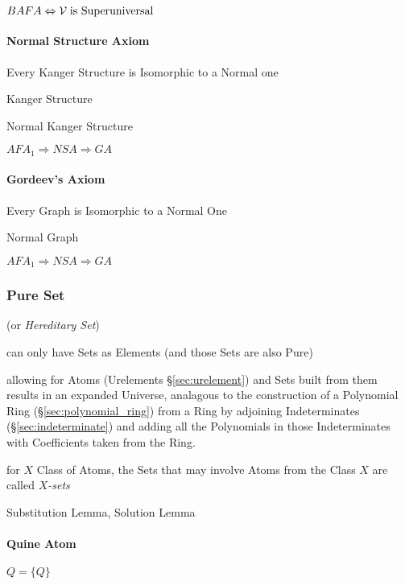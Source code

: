 $BAFA \Leftrightarrow \mathcal{V} \;\text{is Superuniversal}$



\paragraph{Normal Structure Axiom}
\label{sec:normal_structure_axiom}\hfill

Every Kanger Structure is Isomorphic to a Normal one

Kanger Structure

Normal Kanger Structure

$AFA_1 \Rightarrow NSA \Rightarrow GA$


\paragraph{Gordeev's Axiom}\label{sec:gordeevs_axiom}\hfill

Every Graph is Isomorphic to a Normal One

Normal Graph

$AFA_1 \Rightarrow NSA \Rightarrow GA$



\subsubsection{Pure Set}\label{sec:pure_set}

(or \emph{Hereditary Set})

can only have Sets as Elements (and those Sets are also Pure)
\cite{aczel88}

allowing for Atoms (Urelements \S\ref{sec:urelement}) and Sets built
from them results in an expanded Universe, analagous to the
construction of a Polynomial Ring (\S\ref{sec:polynomial_ring}) from a
Ring by adjoining Indeterminates (\S\ref{sec:indeterminate}) and
adding all the Polynomials in those Indeterminates with Coefficients
taken from the Ring.

for $X$ Class of Atoms, the Sets that may involve Atoms from the Class
$X$ are called \emph{$X$-sets}

Substitution Lemma, Solution Lemma



\paragraph{Quine Atom}\label{sec:quine_atom}\hfill

$Q = \{Q\}$

